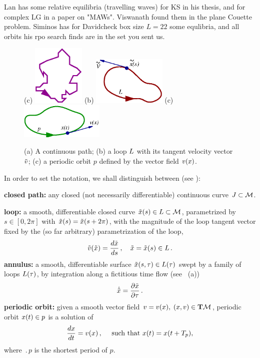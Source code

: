Lan has some relative equilibria (travelling waves) for KS in his
thesis, %
 and for complex LG in a paper on "MAWs".
Viswanath %
found them in the plane Couette problem.
Siminos has for Davidcheck box size $L=22$ some equlibria, and all
orbits his rpo search finds are in the set you sent us.


\begin{figure}[t] %
\centering
(c) \includegraphics[width=2.5cm]{figs/path.eps}
\hspace{0.1in}
(b) \includegraphics[width=3.5cm]{figs/loop.eps}
\hspace{0.1in}
(c) \includegraphics[width=4.0cm]{figs/porbit.eps}
\caption{
 (a) A continuous path; (b) a loop $L$ with its tangent velocity vector $\tilde{v}$;
 (c) a periodic orbit $p$ defined by the vector field $v(x)$.
        }
\label{f:loops}
\end{figure}

    In order to set the notation, we shall distinguish between (see ):

\medskip
\noindent
 {\bf closed path:}
 any closed (not necessarily differentiable) continuous curve 
$J \subset {\cal M}$.

\medskip
\noindent
{\bf loop:}
 a smooth, differentiable closed curve $\tilde{x}(s)\in L \subset 
{\cal M}$, 
parametrized by $s \in [0,2\pi]$ with $\tilde{x}(s)=\tilde{x}(s+2\pi)$, with the
magnitude of the loop tangent vector fixed by 
the (so far arbitrary) parametrization of the loop,
\[
\tilde{v}(\tilde{x})=\frac{d \tilde{x}}{ds}\,, \quad \tilde{x}=\tilde{x}(s) \in L
\,.
\]   
{\bf annulus:} 
 a smooth, differentiable surface $\tilde{x}(s,\tau)\in L(\tau)$ swept by a 
family of loops $L(\tau)$, by integration along a fictitious time flow
(see ~(a))
\[
\dot{\tilde{x}}=\frac{\partial \tilde{x}}{\partial \tau}
\,.
\]
{\bf periodic orbit:}
 given a smooth vector field $v=v(x),\; (x,v) \in {\bf T} {\cal M}$, periodic orbit $x(t) \in p$ is a solution of
\[
\frac{dx}{dt}=v(x) 
	\,,\quad
	\mbox{ such that } x(t)=x(t+{T_{p}}),
\] 
where $\period{p}$ is the shortest period of $p$.



